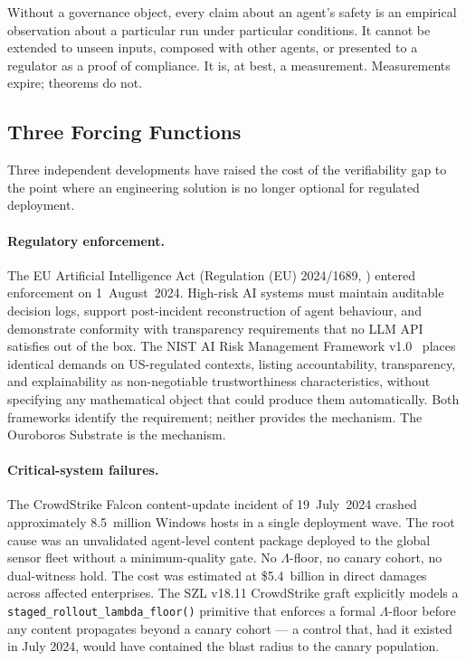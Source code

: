 \medskip

Without a governance object, every claim about an agent's safety is an
empirical observation about a particular run under particular conditions.
It cannot be extended to unseen inputs, composed with other agents, or
presented to a regulator as a proof of compliance.
It is, at best, a measurement.
Measurements expire; theorems do not.

\subsection{Three Forcing Functions}

Three independent developments have raised the cost of the verifiability
gap to the point where an engineering solution is no longer optional for
regulated deployment.

\paragraph{Regulatory enforcement.}
The EU Artificial Intelligence Act (Regulation (EU) 2024/1689,
\cite{euaiact2024}) entered enforcement on 1~August~2024.
High-risk AI systems must maintain auditable decision logs, support
post-incident reconstruction of agent behaviour, and demonstrate conformity
with transparency requirements that no LLM API satisfies out of the box.
The NIST AI Risk Management Framework v1.0~\cite{nist2023ai} places
identical demands on US-regulated contexts, listing accountability,
transparency, and explainability as non-negotiable trustworthiness
characteristics, without specifying any mathematical object that could
produce them automatically.
Both frameworks identify the requirement; neither provides the mechanism.
The Ouroboros Substrate is the mechanism.

\paragraph{Critical-system failures.}
The CrowdStrike Falcon content-update incident of 19~July~2024
\cite{crowdstrike2024incident} crashed approximately 8.5~million Windows
hosts in a single deployment wave.
The root cause was an unvalidated agent-level content package deployed to
the global sensor fleet without a minimum-quality gate.
No \(\Lambda\)-floor, no canary cohort, no dual-witness hold.
The cost was estimated at \$5.4~billion in direct damages across affected
enterprises.
The SZL v18.11 CrowdStrike graft explicitly models a
\texttt{staged\_rollout\_lambda\_floor()} primitive that enforces a
formal \(\Lambda\)-floor before any content propagates beyond a canary
cohort --- a control that, had it existed in July 2024, would have
contained the blast radius to the canary population.

